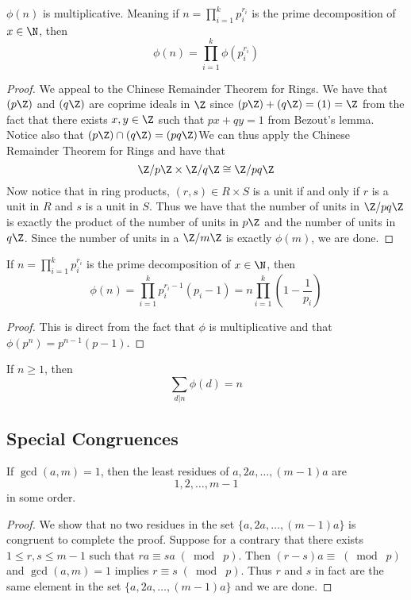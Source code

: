 \begin{thm}{}{} $\phi(n)$ is multiplicative. Meaning if $n=\prod_{i=1}^kp_i^{r_i}$ is the prime decomposition of $x\in\N$, then $$\phi(n)=\prod_{i=1}^k\phi(p_i^{r_i})$$ \tcbline
\begin{proof}
We appeal to the Chinese Remainder Theorem for Rings. We have that $(p\Z)$ and $(q\Z)$ are coprime ideals in $\Z$ since $(p\Z)+(q\Z)=(1)=\Z$ from the fact that there exists $x,y\in\Z$ such that $px+qy=1$ from Bezout's lemma. Notice also that $(p\Z)\cap(q\Z)=(pq\Z)$We can thus apply the Chinese Remainder Theorem for Rings and have that $$\Z/p\Z\times\Z/q\Z\cong\Z/pq\Z$$ Now notice that in ring products, $(r,s)\in R\times S$ is a unit if and only if $r$ is a unit in $R$ and $s$ is a unit in $S$. Thus we have that the number of units in $\Z/pq\Z$ is exactly the product of the number of units in $p\Z$ and the number of units in $q\Z$. Since the number of units in a $\Z/m\Z$ is exactly $\phi(m)$, we are done. 
\end{proof}
\end{thm}

\begin{crl}{}{} If $n=\prod_{i=1}^kp_i^{r_i}$ is the prime decomposition of $x\in\N$, then $$\phi(n)=\prod_{i=1}^kp_i^{r_i-1}(p_i-1)=n\prod_{i=1}^k\left(1-\frac{1}{p_i}\right)$$ \tcbline
\begin{proof}
This is direct from the fact that $\phi$ is multiplicative and that $\phi(p^n)=p^{n-1}(p-1)$. 
\end{proof}
\end{crl}

\begin{thm}{}{} If $n\geq 1$, then $$\sum_{d|n}\phi(d)=n$$
\end{thm}

\subsection{Special Congruences}
\begin{lmm}{}{} If $\gcd(a,m)=1$, then the least residues of $a,2a,\dots,(m-1)a$ are $$1,2,\dots,m-1$$ in some order. \tcbline
\begin{proof}
We show that no two residues in the set $\{a,2a,\dots,(m-1)a\}$ is congruent to complete the proof. Suppose for a contrary that there exists $1\leq r,s\leq m-1$ such that $ra\equiv sa\;(\bmod\;p)$. Then $(r-s)a\equiv\;(\bmod\;p)$ and $\gcd(a,m)=1$ implies $r\equiv s\;(\bmod\;p)$. Thus $r$ and $s$ in fact are the same element in the set $\{a,2a,\dots,(m-1)a\}$ and we are done. 
\end{proof}
\end{lmm}

